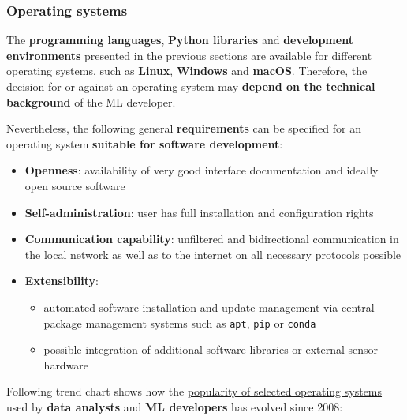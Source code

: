 \documentclass [oneside,10pt,a4paper,ngerman,BCOR10mm,headsepline,parindent,final]{scrartcl}
\providecommand{\tightlist}{%
      \setlength{\itemsep}{0pt}\setlength{\parskip}{0pt}}
\begin{document}
    \hypertarget{operating-systems}{%
\subsubsection{Operating systems}\label{operating-systems}}

The \textbf{programming languages}, \textbf{Python libraries} and
\textbf{development environments} presented in the previous sections are
available for different operating systems, such as \textbf{Linux},
\textbf{Windows} and \textbf{macOS}. Therefore, the decision for or
against an operating system may \textbf{depend on the technical
background} of the ML developer.

Nevertheless, the following general \textbf{requirements} can be
specified for an operating system \textbf{suitable for software
development}:

\begin{itemize}
\tightlist
\item
  \textbf{Openness}: availability of very good interface documentation
  and ideally open source software
\item
  \textbf{Self-administration}: user has full installation and
  configuration rights
\item
  \textbf{Communication capability}: unfiltered and bidirectional
  communication in the local network as well as to the internet on all
  necessary protocols possible
\item
  \textbf{Extensibility}:

  \begin{itemize}
  \tightlist
  \item
    automated software installation and update management via central
    package management systems such as \texttt{apt}, \texttt{pip} or
    \texttt{conda}
  \item
    possible integration of additional software libraries or external
    sensor hardware
  \end{itemize}
\end{itemize}

Following trend chart shows how the
\href{https://insights.stackoverflow.com/trends?tags=windows\%2Clinux\%2Cmacos}{popularity
of selected operating systems} used by \textbf{data analysts} and
\textbf{ML developers} has evolved since 2008:
\end{document}
